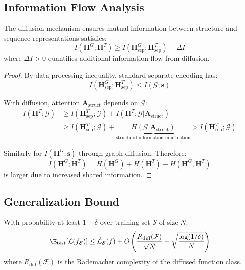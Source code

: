 \documentclass[12pt,en]{elegantpaper}
\begin{document}
\subsection{Information Flow Analysis}

\begin{lemma}
The diffusion mechanism ensures mutual information between structure and sequence representations satisfies:
\begin{equation}
    I(\mathbf{H}^G; \mathbf{H}^T) \geq I(\mathbf{H}_{\text{sep}}^G; \mathbf{H}_{\text{sep}}^T) + \Delta I
\end{equation}
where $\Delta I > 0$ quantifies additional information flow from diffusion.
\end{lemma}

\begin{proof}
By data processing inequality, standard separate encoding has:
\begin{equation}
    I(\mathbf{H}_{\text{sep}}^G; \mathbf{H}_{\text{sep}}^T) \leq I(\mathcal{G}; \mathbf{s})
\end{equation}

With diffusion, attention $\mathbf{A}_{\text{struct}}$ depends on $\mathcal{G}$:
\begin{align}
    I(\mathbf{H}^T; \mathcal{G}) &\geq I(\mathbf{H}_{\text{sep}}^T; \mathcal{G}) + I(\mathbf{H}^T; \mathcal{G} | \mathbf{A}_{\text{struct}}) \\
    &\geq I(\mathbf{H}_{\text{sep}}^T; \mathcal{G}) + \underbrace{H(\mathcal{G} | \mathbf{A}_{\text{struct}})}_{\text{structural information in attention}} > I(\mathbf{H}_{\text{sep}}^T; \mathcal{G})
\end{align}

Similarly for $I(\mathbf{H}^G; \mathbf{s})$ through graph diffusion. Therefore:
\begin{equation}
    I(\mathbf{H}^G; \mathbf{H}^T) = H(\mathbf{H}^G) + H(\mathbf{H}^T) - H(\mathbf{H}^G, \mathbf{H}^T)
\end{equation}
is larger due to increased shared information.
\end{proof}

\subsection{Generalization Bound}

\begin{theorem}
With probability at least $1-\delta$ over training set $\mathcal{S}$ of size $N$:
\begin{equation}
    \E_{\text{test}}[\mathcal{L}(f_{\mathcal{S}})] \leq \hat{\mathcal{L}}_{\mathcal{S}}(f) + O\left(\frac{R_{\text{diff}}(\mathcal{F})}{\sqrt{N}} + \sqrt{\frac{\log(1/\delta)}{N}}\right)
\end{equation}
where $R_{\text{diff}}(\mathcal{F})$ is the Rademacher complexity of the diffused function class.
\end{theorem}
\end{document}
